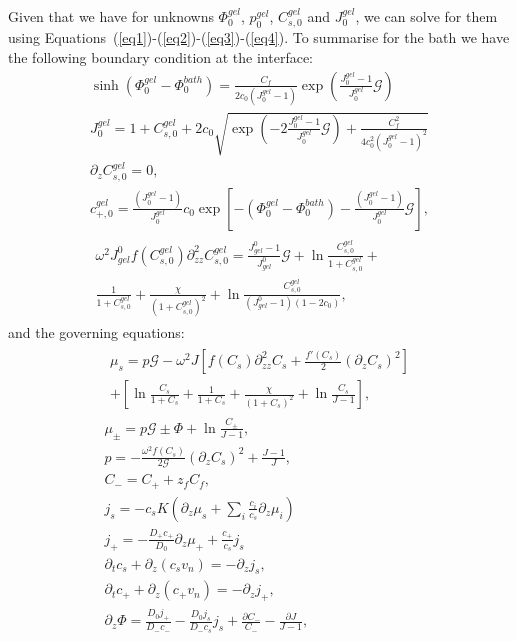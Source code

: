 \documentclass[12pt]{extarticle}
\begin{document}
Given that we have for unknowns $\Phi^{gel}_0$, $p^{gel}_0$, $C^{gel}_{s,0}$ and $J^{gel}_0$, we can solve for them using Equations~(\ref{eq1})-(\ref{eq2})-(\ref{eq3})-(\ref{eq4}). 
To summarise for the bath we have the following boundary condition at the interface:
\begin{gather}
\sinh(\Phi_0^{gel}-\Phi_0^{bath})= \frac{C_f}{2c_0 (J_0^{gel}-1)}\exp\left(\frac{J^{gel}_0-1}{J^{gel}_0}\mathcal{G}\right)\\
J^{gel}_0=1+C^{gel}_{s,0}+ 2c_0\sqrt{\exp\left(-2\frac{J^{gel}_0-1}{J^{gel}_0}\mathcal{G}\right)+\frac{C^2_f}{4c^2_0 (J_0^{gel}-1)^2}}\\[4mm]
\partial_z C^{gel}_{s,0}=0,\\[5mm]
c^{gel}_{+,0} = \frac{(J^{gel}_0-1)}{J^{gel}_0}c_0\exp[-(\Phi^{gel}_0-\Phi_0^{bath})-\frac{(J^{gel}_0-1)}{J^{gel}_0}\mathcal{G}],\\
\begin{aligned}
\omega^2 J^0_{gel} f(C^{gel}_{s,0})\partial_{zz}^2 C^{gel}_{s,0}= \frac{J^0_{gel}-1}{J^0_{gel}} \mathcal{G}  + \ln \frac{C^{gel}_{s,0}}{1+C^{gel}_{s,0}} +\\ \frac{1}{1+C^{gel}_{s,0}}+\frac{\chi}{(1+C^{gel}_{s,0})^2} + \ln \frac{C^{gel}_{s,0}}{(J^0_{gel}-1)(1-2c_0)}, 
\end{aligned}
\end{gather}
and the governing equations:
\begin{gather}
\begin{aligned}
\mu_s = p \mathcal{G}  - \omega^2 J \left[f(C_s)\partial_{zz}^2 C_s+\frac{f'(C_s)}{2}\left(\partial_z C_s\right)^2\right]\\
+ \left[\ln \frac{C_s}{1+C_s} + \frac{1}{1+C_s}+\frac{\chi}{(1+C_s)^2} + \ln \frac{C_s}{J-1} \right], 
\end{aligned}\\[2.5mm]
\mu_\pm = p \mathcal{G} \pm \Phi + \ln \frac{C_\pm}{J-1} ,\\
p=-\frac{\omega^2 f(C_s)}{2\mathcal{G}} (\partial_z C_s)^2+ \frac{J-1}{J},\\
C_- = C_+ + z_f C_f,\\
j_s =-c_sK  \left(\partial_z\mu_s +\sum_i \frac{c_i}{c_s} \partial_z \mu_i\right)\\
j_+= - \frac{D_+ c_+}{D_0}\partial_z \mu_+ + \frac{c_+}{c_s}j_s\\
\partial_t c_s + \partial_z (c_s v_n)=- \partial_z j_s,\\
\partial_t c_+ +\partial_z (c_+ v_n)= -\partial_zj_+,\\
\partial_z \Phi = \frac{D_0 j_+}{D_-c_-}- \frac{D_0 j_s}{D_-c_s}j_s + \frac{\partial C_-}{C_-}-\frac{\partial J}{J-1},
\end{gather}
\end{document}
